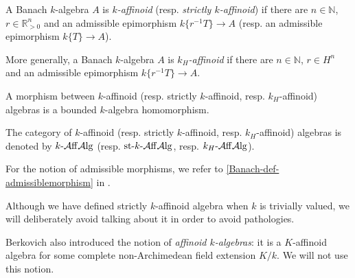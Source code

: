 \begin{definition}
    A Banach $k$-algebra $A$ is \emph{$k$-affinoid} (resp. \emph{strictly $k$-affinoid}) if there are $n\in \mathbb{N}$, $r\in \mathbb{R}^n_{>0}$ and an admissible epimorphism $k\{r^{-1}T\}\rightarrow A$ (resp. an admissible epimorphism $k\{T\}\rightarrow A$).


    More generally, a Banach $k$-algebra $A$ is \emph{$k_H$-affinoid} if there are $n\in \mathbb{N}$, $r\in H^n$  and an admissible epimorphism $k\{r^{-1}T\}\rightarrow A$.

    A morphism between $k$-affinoid (resp. strictly $k$-affinoid, resp. $k_H$-affinoid) algebras is a bounded $k$-algebra homomorphism.

    The category of $k$-affinoid (resp. strictly $k$-affinoid, resp. $k_H$-affinoid) algebras is denoted by $k\text{-}\mathcal{A}\mathrm{ff}\mathcal{A}\mathrm{lg}$ (resp. $\text{st-}k\text{-}\mathcal{A}\mathrm{ff}\mathcal{A}\mathrm{lg}$, resp. $k_H\text{-}\mathcal{A}\mathrm{ff}\mathcal{A}\mathrm{lg}$). 
    
    

\end{definition}
For the notion of admissible morphisms, we refer to \cref{Banach-def-admissiblemorphism} in .

Although we have defined strictly $k$-affinoid algebra when $k$ is trivially valued, we will deliberately avoid talking about it in order to avoid pathologies.
\begin{remark}
    Berkovich also introduced the notion of \emph{affinoid $k$-algebras}: it is a $K$-affinoid algebra for some complete non-Archimedean field extension $K/k$. We will not use this notion.
\end{remark}


